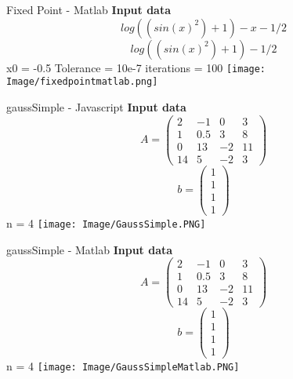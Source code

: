 \documentclass{article}
\begin{document}
\begin{section}{Fixed Point - Matlab}
   \textbf{Input data}\newline
    \[log((sin(x)^2)+1)-x-1/2\]\newline
    \[log((sin(x)^2)+1)-1/2\]\newline
    x0 = -0.5\newline
    Tolerance = 10e-7\newline
    iterations = 100 \newline\newline
    \texttt{[image: Image/fixedpointmatlab.png]}
\end{section}
\begin{section}{gaussSimple - Javascript}
   \textbf{Input data}\newline
    \[A=\begin{pmatrix}
        2 & -1 & 0 & 3\\
        1 & 0.5 & 3 & 8\\
        0 & 13 & -2 & 11\\
        14 & 5 & -2 & 3
    \end{pmatrix}\]
    \[b=\begin{pmatrix}
        1\\
        1\\
        1\\
        1
    \end{pmatrix}\]
    n = 4\newline\newline
    \texttt{[image: Image/GaussSimple.PNG]}
\end{section}
\begin{section}{gaussSimple - Matlab}
   \textbf{Input data}\newline
    \[A=\begin{pmatrix}
        2 & -1 & 0 & 3\\
        1 & 0.5 & 3 & 8\\
        0 & 13 & -2 & 11\\
        14 & 5 & -2 & 3
    \end{pmatrix}\]
    \[b=\begin{pmatrix}
        1\\
        1\\
        1\\
        1
    \end{pmatrix}\]
    n = 4\newline\newline
    \texttt{[image: Image/GaussSimpleMatlab.PNG]}
\end{section}
\end{document}
